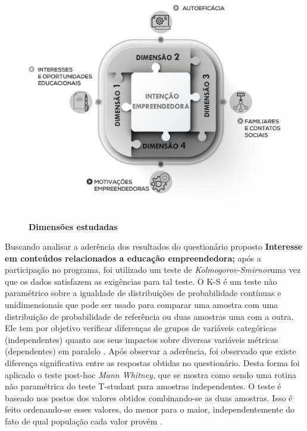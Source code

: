\begin{figure}[H]
\centering
\caption{\textbf{Dimensões estudadas}}
\includegraphics[scale=0.3]{Imagens/dimencoes.png}
\label{figura_9}
\end{figure}






Buscando analisar a aderência dos resultados do questionário proposto \textbf{Interesse em conteúdos relacionados a educação empreendedora;} após a participação no programa, foi utilizado um teste de \textit{Kolmogorov-Smirnov}uma vez que os dados satisfazem as exigências para tal teste. O K-S é um teste não paramétrico sobre a igualdade de distribuições de probabilidade contínuas e unidimensionais que pode ser usado para comparar uma amostra com uma distribuição de probabilidade de referência ou duas amostras uma com a outra. Ele tem por objetivo verificar diferenças de grupos de variáveis categóricas (independentes) quanto aos seus impactos sobre diversas variáveis métricas (dependentes) em paralelo \cite{hair_alise_2009}. Após observar a aderência, foi observado que existe diferença significativa entre as respostas obtidas no questionário. Desta forma foi aplicado o teste post-hoc \textit{Mann Whitney}, que se mostra como sendo uma rotina não paramétrica do teste T-studant para amostras independentes. O teste  é baseado nos postos dos valores obtidos combinando-se as duas amostras. Isso é feito ordenando-se esses valores, do menor para o maior, independentemente do fato de qual população cada valor provém \cite{matsouaka_optimal_2018}.

